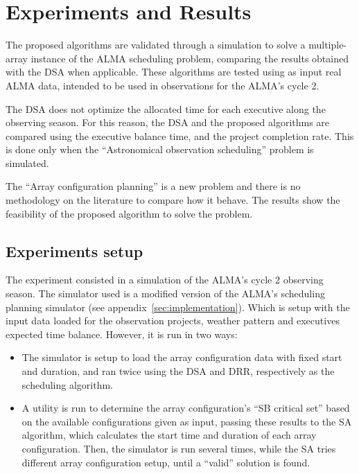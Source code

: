 \chapter{Experiments and Results}

The proposed algorithms are validated through a simulation to solve a
multiple-array instance of the ALMA scheduling problem, comparing the results obtained with the DSA when applicable.
These algorithms are tested using as input real ALMA data, intended to be used in observations for the ALMA's cycle 2.

The DSA does not optimize the allocated time for each executive along the observing season. For this reason, the DSA and the proposed algorithms are compared using the executive balance time, and the project completion rate. This is done only when the ``Astronomical observation scheduling'' problem is simulated.

The ``Array configuration planning'' is a new problem and there is no methodology on the literature to compare how it behave. The results show the feasibility of the proposed algorithm to solve the problem.

\section{Experiments setup}

The experiment consisted in a simulation of the ALMA's cycle 2 observing season. The simulator used is a modified version of the ALMA's scheduling planning simulator (see appendix~\ref{sec:implementation}). Which is setup with the input data loaded for the observation projects, weather pattern and executives expected time balance. However, it is run in two ways:
\begin{itemize}
\item The simulator is setup to load the array configuration data with fixed start and duration, and ran twice using the DSA and DRR, respectively as the scheduling algorithm.

\item A utility is run to determine the array configuration's ``SB critical set'' based on the available configurations given as input, passing these results to the SA algorithm, which calculates the start time and duration of each array configuration. Then, the simulator is run several times, while the SA tries different array configuration setup, until a ``valid'' solution is found.
\end{itemize}

